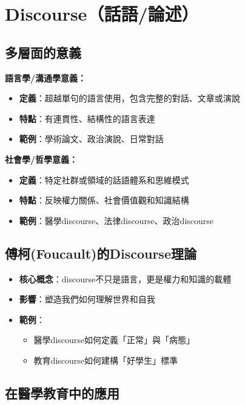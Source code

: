 \documentclass[12pt,a4paper]{article}
\begin{document}
\section{Discourse（話語/論述）}

\subsection{多層面的意義}

\textbf{語言學/溝通學意義：}
\begin{itemize}[nosep]
    \item \textbf{定義}：超越單句的語言使用，包含完整的對話、文章或演說
    \item \textbf{特點}：有連貫性、結構性的語言表達
    \item \textbf{範例}：學術論文、政治演說、日常對話
\end{itemize}

\textbf{社會學/哲學意義：}
\begin{itemize}[nosep]
    \item \textbf{定義}：特定社群或領域的話語體系和思維模式
    \item \textbf{特點}：反映權力關係、社會價值觀和知識結構
    \item \textbf{範例}：醫學discourse、法律discourse、政治discourse
\end{itemize}

\subsection{傅柯(Foucault)的Discourse理論}

\begin{itemize}[nosep]
    \item \textbf{核心概念}：discourse不只是語言，更是權力和知識的載體
    \item \textbf{影響}：塑造我們如何理解世界和自我
    \item \textbf{範例}：
    \begin{itemize}[nosep]
        \item 醫學discourse如何定義「正常」與「病態」
        \item 教育discourse如何建構「好學生」標準
    \end{itemize}
\end{itemize}

\subsection{在醫學教育中的應用}
\end{document}
